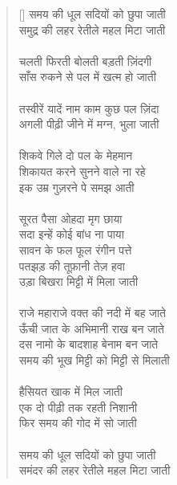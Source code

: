 \begin{verse}[\versewidth]\texthindi{
समय की धूल सदियों को छुपा जाती \\
समुद्र की लहर रेतीले महल मिटा जाती \\
\\
चलती फिरती बोलती बड़ती ज़िंदगी\\
साँस रुकने से पल में खत्म हो जाती\\
\\
तस्वीरें यादें नाम काम कुछ पल ज़िंदा\\
अगली पीढ़ी जीने में मग्न, भुला जाती \\
\\
शिकवे गिले दो पल के मेहमान\\
शिकायत करने सुनने वाले ना रहे \\
इक उम्र गुज़रने पे समझ आती\\
\\
सूरत पैसा ओहदा मृग छाया\\
सदा इन्हें कोई बांध ना पाया\\
सावन के फल फूल रंगीन पत्ते \\
पतझड़ की तूफ़ानी तेज़ हवा \\
उड़ा बिखरा मिट्टी में मिला जाती\\
\\
राजे महाराजे वक्त की नदी में बह जाते    \\
 ऊँची जात के अभिमानी राख बन जाते \\
दस नामो के बादशाह बेनाम बन जाते \\
समय की भूख मिट्टी को मिट्टी से मिलाती \\
\\
हैसियत खाक में मिल जाती\\
एक दो पीढ़ी तक रहती निशानी \\
फिर समय की गोद में सो जाती\\
\\
समय की धूल सदियों को छुपा जाती \\
समंदर की लहर रेतीले महल मिटा जाती
}\end{verse}
